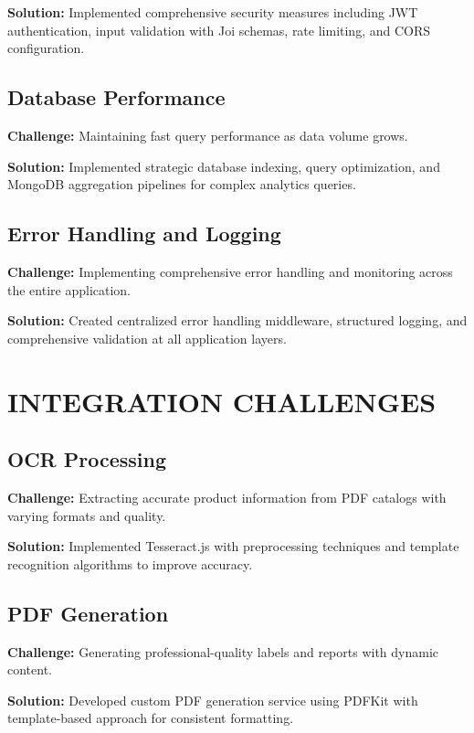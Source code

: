 \textbf{Solution:} Implemented comprehensive security measures including JWT authentication, input validation with Joi schemas, rate limiting, and CORS configuration.

\subsection{Database Performance}

\textbf{Challenge:} Maintaining fast query performance as data volume grows.

\textbf{Solution:} Implemented strategic database indexing, query optimization, and MongoDB aggregation pipelines for complex analytics queries.

\subsection{Error Handling and Logging}

\textbf{Challenge:} Implementing comprehensive error handling and monitoring across the entire application.

\textbf{Solution:} Created centralized error handling middleware, structured logging, and comprehensive validation at all application layers.

\section{INTEGRATION CHALLENGES}

\subsection{OCR Processing}

\textbf{Challenge:} Extracting accurate product information from PDF catalogs with varying formats and quality.

\textbf{Solution:} Implemented Tesseract.js with preprocessing techniques and template recognition algorithms to improve accuracy.

\subsection{PDF Generation}

\textbf{Challenge:} Generating professional-quality labels and reports with dynamic content.

\textbf{Solution:} Developed custom PDF generation service using PDFKit with template-based approach for consistent formatting.

